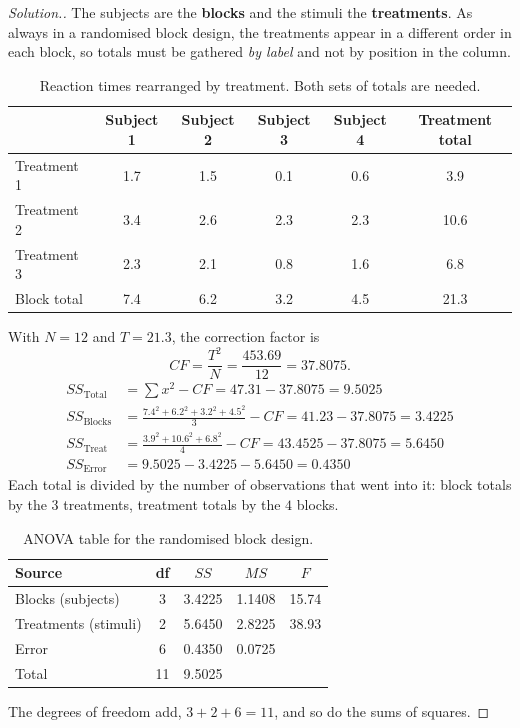 \documentclass[11pt,a4paper]{article}
\theoremstyle{definition}
\newenvironment{solution}
  {\renewcommand{\qedsymbol}{}\begin{proof}[\textit{Solution}.]}
  {\end{proof}}
\begin{document}
\begin{solution}
The subjects are the \textbf{blocks} and the stimuli the \textbf{treatments}. As always in a
randomised block design, the treatments appear in a different order in each block, so totals
must be gathered \emph{by label} and not by position in the column.
\begin{table}[H]
\centering
\begin{tabular}{|l|c|c|c|c|c|}
\hline
 & Subject 1 & Subject 2 & Subject 3 & Subject 4 & Treatment total\\
\hline
Treatment 1 & 1.7 & 1.5 & 0.1 & 0.6 & 3.9\\
Treatment 2 & 3.4 & 2.6 & 2.3 & 2.3 & 10.6\\
Treatment 3 & 2.3 & 2.1 & 0.8 & 1.6 & 6.8\\
\hline
Block total & 7.4 & 6.2 & 3.2 & 4.5 & 21.3\\
\hline
\end{tabular}
\caption{Reaction times rearranged by treatment. Both sets of totals are needed.}
\end{table}

With $N=12$ and $T=21.3$, the correction factor is
\[CF=\frac{T^2}{N}=\frac{453.69}{12}=37.8075.\]
\begin{align*}
SS_{\text{Total}} &=\sum x^2-CF=47.31-37.8075=9.5025\\
SS_{\text{Blocks}} &=\frac{7.4^2+6.2^2+3.2^2+4.5^2}{3}-CF=41.23-37.8075=3.4225\\
SS_{\text{Treat}} &=\frac{3.9^2+10.6^2+6.8^2}{4}-CF=43.4525-37.8075=5.6450\\
SS_{\text{Error}} &=9.5025-3.4225-5.6450=0.4350
\end{align*}
Each total is divided by the number of observations that went into it: block totals by the
$3$ treatments, treatment totals by the $4$ blocks.

\begin{table}[H]
\centering
\begin{tabular}{|l|c|c|c|c|}
\hline
Source & df & $SS$ & $MS$ & $F$\\
\hline
Blocks (subjects) & 3 & 3.4225 & 1.1408 & 15.74\\
Treatments (stimuli) & 2 & 5.6450 & 2.8225 & 38.93\\
Error & 6 & 0.4350 & 0.0725 & \\
\hline
Total & 11 & 9.5025 & & \\
\hline
\end{tabular}
\caption{ANOVA table for the randomised block design.}
\end{table}
The degrees of freedom add, $3+2+6=11$, and so do the sums of squares.


\end{solution}
\end{document}
